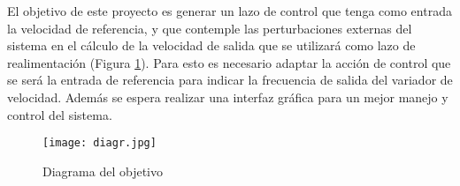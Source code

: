 El objetivo de este proyecto es generar un lazo de control que tenga como entrada la velocidad de referencia, y que contemple las perturbaciones externas del sistema en el cálculo de la velocidad de salida que se utilizará como lazo de realimentación (Figura \ref{fig:diagr}). 
Para esto es necesario adaptar la acción de control que se será la entrada de referencia para indicar la frecuencia de salida del variador de velocidad.
Además se espera realizar una interfaz gráfica para un mejor manejo y control del sistema.

\begin{figure}[htb]
	\centering
	\texttt{[image: diagr.jpg]}
	\caption{Diagrama del objetivo}
	\label{fig:diagr}
	\end{figure}


	\newpage
